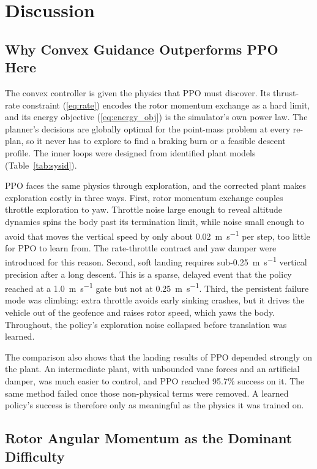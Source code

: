 \documentclass[conference]{IEEEtran}
\begin{document}
\section{Discussion}

\subsection{Why Convex Guidance Outperforms PPO Here}

The convex controller is given the physics that PPO must discover. Its thrust-rate constraint (\ref{eq:rate}) encodes the rotor momentum exchange as a hard limit, and its energy objective (\ref{eq:energy_obj}) is the simulator's own power law. The planner's decisions are globally optimal for the point-mass problem at every re-plan, so it never has to explore to find a braking burn or a feasible descent profile. The inner loops were designed from identified plant models (Table~\ref{tab:sysid}).

PPO faces the same physics through exploration, and the corrected plant makes exploration costly in three ways. First, rotor momentum exchange couples throttle exploration to yaw. Throttle noise large enough to reveal altitude dynamics spins the body past its termination limit, while noise small enough to avoid that moves the vertical speed by only about \SI{0.02}{\metre\per\second} per step, too little for PPO to learn from. The rate-throttle contract and yaw damper were introduced for this reason. Second, soft landing requires sub-\SI{0.25}{\metre\per\second} vertical precision after a long descent. This is a sparse, delayed event that the policy reached at a \SI{1.0}{\metre\per\second} gate but not at \SI{0.25}{\metre\per\second}. Third, the persistent failure mode was climbing: extra throttle avoids early sinking crashes, but it drives the vehicle out of the geofence and raises rotor speed, which yaws the body. Throughout, the policy's exploration noise collapsed before translation was learned.

The comparison also shows that the landing results of PPO depended strongly on the plant. An intermediate plant, with unbounded vane forces and an artificial damper, was much easier to control, and PPO reached 95.7\% success on it. The same method failed once those non-physical terms were removed. A learned policy's success is therefore only as meaningful as the physics it was trained on.

\subsection{Rotor Angular Momentum as the Dominant Difficulty}
\end{document}
